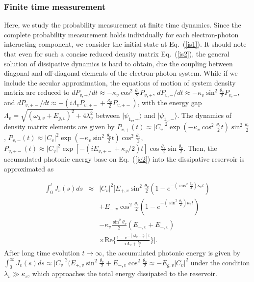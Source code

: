 \documentclass[twocolumn,showpacs,preprintnumbers,amsmath,amssymb]{revtex4}
\begin{document}
	
	
	
	
	\subsubsection{Finite time measurement}
	Here, we study the probability measurement at finite time dynamics.
	Since the complete probability measurement holds individually for each electron-photon interacting component, we consider the initial state  at Eq.~(\ref{is1}).
	It should note that even for such a concise reduced density matrix Eq.~(\ref{is2}),
	the general solution of dissipative dynamics is hard to obtain, due the coupling between diagonal and off-diagonal elements of the electron-photon system.
	While if we include the secular approximation,
	the equations of motion of system density matrix are reduced to
	${dP_{v,+}}/{dt}{\approx}{-\kappa_v}\cos^2 \frac{\theta_v}{2}P_{v,+}$,
	${dP_{v,-}}/{dt}{\approx}{-\kappa_v}\sin^2 \frac{\theta_v}{2}P_{v,-}$,
	and
	${dP_{v,+-}}/{dt}\approx-(i \Lambda_v P_{v,+-}+\frac{\kappa_v}{2}P_{v,+-})$,
	with the energy gap
	$\Lambda_v=\sqrt{({\omega_{0,v}+E_{g,v}})^2+4\lambda^2_v}$
	between $|\psi_{1_v,+}{\rangle}$ and  $|\psi_{1_v,-}{\rangle}$.
	The dynamics of density matrix elements are given by
	$P_{v,+}(t)\approx|C_v|^2\exp(-\kappa_v\cos^2\frac{\theta_v}{2}t)\sin^2\frac{\theta_v}{2}$,
	$P_{v,-}(t)\approx|C_v|^2\exp(-\kappa_v\sin^2\frac{\theta_v}{2}t)\cos^2\frac{\theta_v}{2}$,
	$P_{v,+-}(t)\approx|C_v|^2\exp[-(iE_{v,+-}+\kappa_v/2)t]\cos\frac{\theta_v}{2}\sin\frac{\theta_v}{2}$.
	Then, the accumulated photonic energy base on Eq.~(\ref{je2}) into the dissipative reservoir is approximated as
	
	\begin{eqnarray}
		\int^t_0J_v(s)ds&\approx&|C_v|^2\Big[
		E_{+,v}\sin^2\frac{\theta_v}{2}(1-e^{-(\cos^2\frac{\theta_v}{2})\kappa_vt})\nonumber\\
		&&+E_{-,v}\cos^2\frac{\theta_v}{2}(1-e^{-(\sin^2\frac{\theta_v}{2})\kappa_vt})\nonumber\\
		&&-\kappa_v\frac{\sin^2\theta_v}{2}(E_{+,v}+E_{-,v})\nonumber\\
		&&{\times}
		\textrm{Re}\{\frac{1-e^{-(i\Lambda_v+\frac{\kappa_v}{2})t}}{i\Lambda_v+\frac{\kappa_v}{2}}\}
		\Big].
	\end{eqnarray}	
After long time evolution $t{\rightarrow}\infty$,
	the accumulated photonic energy is given by
	$\int^\infty_0J_v(s)ds{\approx}
	|C_v|^2(E_{+,v}\sin^2\frac{\theta_v}{2}+E_{-,v}\cos^2\frac{\theta_v}{2}{\approx}-E_{g,v}|C_v|^2$
	under the condition $\lambda_v{\gg}\kappa_v$,
	which approaches the total energy dissipated to the reservoir.
	
\end{document}
